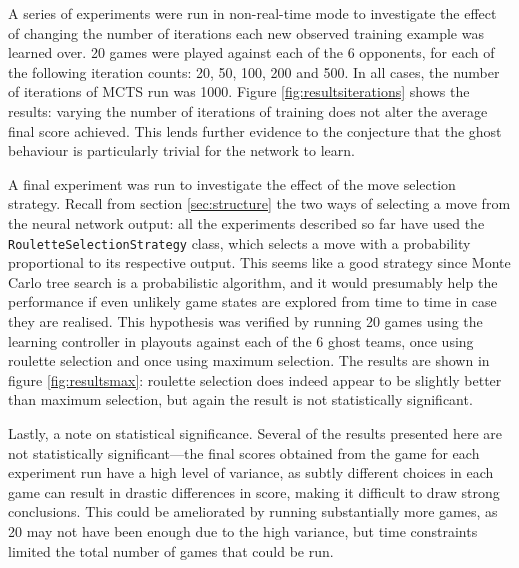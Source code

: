 A series of experiments were run in non-real-time mode to investigate the effect of changing the number of iterations each new observed training example was learned over.  20 games were played against each of the 6 opponents, for each of the following iteration counts: 20, 50, 100, 200 and 500.  In all cases, the number of iterations of MCTS run was 1000.  Figure \ref{fig:resultsiterations} shows the results: varying the number of iterations of training does not alter the average final score achieved.  This lends further evidence to the conjecture that the ghost behaviour is particularly trivial for the network to learn.

A final experiment was run to investigate the effect of the move selection strategy.  Recall from section \ref{sec:structure} the two ways of selecting a move from the neural network output: all the experiments described so far have used the {\tt RouletteSelectionStrategy} class, which selects a move with a probability proportional to its respective output.  This seems like a good strategy since Monte Carlo tree search is a probabilistic algorithm, and it would presumably help the performance if even unlikely game states are explored from time to time in case they are realised.  This hypothesis was verified by running 20 games using the learning controller in playouts against each of the 6 ghost teams, once using roulette selection and once using maximum selection.  The results are shown in figure \ref{fig:resultsmax}: roulette selection does indeed appear to be slightly better than maximum selection, but again the result is not statistically significant.

Lastly, a note on statistical significance.  Several of the results presented here are not statistically significant---the final scores obtained from the game for each experiment run have a high level of variance, as subtly different choices in each game can result in drastic differences in score, making it difficult to draw strong conclusions.  This could be ameliorated by running substantially more games, as 20 may not have been enough due to the high variance, but time constraints limited the total number of games that could be run.

